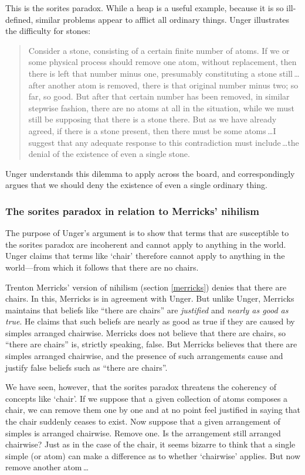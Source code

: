 \documentclass[11pt]{standalone} \newif\ifstandlone \standalonetrue
\newenvironment{squote}{%
	\begin{quote}\begin{singlespace}%
	}{%
	\end{singlespace}\end{quote}}
\begin{document}
\begin{spacing}{1.5}
This is the sorites paradox.  While a heap is a useful example,
because it is so ill-defined, similar problems appear to afflict all
ordinary things.  Unger illustrates the difficulty for stones:

\begin{squote}
Consider a stone, consisting of a certain finite number of atoms.  If
we or some physical process should remove one atom, without
replacement, then there is left that number minus one, presumably
constituting a stone still\,\ldots after another atom is removed,
there is that original number minus two; so far, so good.  But after
that certain number has been removed, in similar stepwise fashion,
there are no atoms at all in the situation, while we must still be
supposing that there is a stone there.  But as we have already agreed,
if there is a stone present, then there must be some atoms\,\ldots I
suggest that any adequate response to this contradiction must
include\,\ldots the denial of the existence of even a single
stone.~\citep[121--122]{unger1979}
\end{squote}
Unger understands this dilemma to apply across the board, and
correspondingly argues that we should deny the existence of even a
single ordinary thing.

\subsubsection{The sorites paradox in relation to Merricks' nihilism}
The purpose of Unger's argument is to show that terms that are
susceptible to the sorites paradox are incoherent and cannot apply to
anything in the world.  Unger claims that terms like `chair' therefore
cannot apply to anything in the world---from which it follows that
there are no chairs.

Trenton Merricks' version of nihilism (section \ref{merricks}) denies
that there are chairs.  In this, Merricks is in agreement with Unger.
But unlike Unger, Merricks maintains that beliefs like ``there are
chairs'' are {\em justified} and {\em nearly as good as true}.  He
claims that such beliefs are nearly as good as true if they are caused
by simples arranged chairwise.  Merricks does not believe that there
are chairs, so ``there are chairs'' is, strictly speaking, false.  But
Merricks believes that there are simples arranged chairwise, and the
presence of such arrangements cause and justify false beliefs such as
``there are chairs''.

We have seen, however, that the sorites paradox threatens the
coherency of concepts like `chair'.  If we suppose that a given
collection of atoms composes a chair, we can remove them one by one
and at no point feel justified in saying that the chair suddenly
ceases to exist.  Now suppose that a given arrangement of simples is
arranged chairwise.  Remove one.  Is the arrangement still arranged
chairwise?  Just as in the case of the chair, it seems bizarre to
think that a single simple (or atom) can make a difference as to
whether `chairwise' applies.  But now remove another atom\,\ldots


\end{spacing}
\end{document}
